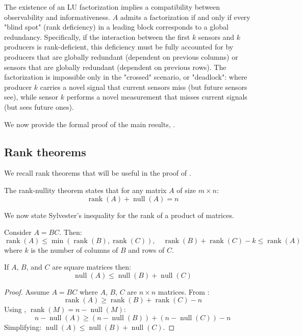 \documentclass[10pt,twoside]{siamart1116}
\DeclareMathOperator{\rk}{rank}
\DeclareMathOperator{\nl}{null}
\numberwithin{theorem}{section}
\begin{document}
The existence of an LU factorization implies a compatibility between observability and informativeness. $A$ admits a factorization if and only if every "blind spot" (rank deficiency) in a leading block corresponds to a global redundancy. Specifically, if the interaction between the first $k$ sensors and $k$ producers is rank-deficient, this deficiency must be fully accounted for by producers that are globally redundant (dependent on previous columns) or sensors that are globally redundant (dependent on previous rows). The factorization is impossible only in the "crossed" scenario, or "deadlock": where producer $k$ carries a novel signal that current sensors miss (but future sensors see), while sensor $k$ performs a novel measurement that misses current signals (but sees future ones).

We now provide the formal proof of the main results, .

\subsection{Rank theorems}

We recall rank theorems that will be useful in the proof of .

\begin{theorem}\label{thm:rank-nullity}
	The rank-nullity theorem states that for any matrix $A$ of size $m \times n$:
	\[
		\rk(A) + \nl(A) = n
	\]
\end{theorem}

We now state Sylvester's inequality for the rank of a product of matrices.

\begin{lemma}\label{lem:rank}
	Consider $A = BC$. Then:
	\[
		\rk(A) \le \min(\rk(B), \rk(C)), \quad
		\rk(B) + \rk(C) - k \le \rk(A)
	\]
	where $k$ is the number of columns of $B$ and rows of $C$.
\end{lemma}

\begin{corollary}\label{cor:nullity}
	If $A$, $B$, and $C$ are square matrices then:
	\[
		\nl(A) \le \nl(B) + \nl(C)
	\]
\end{corollary}

\begin{proof}
	Assume $A = BC$ where $A$, $B$, $C$ are $n \times n$ matrices. From :
	\[ \rk(A) \ge \rk(B) + \rk(C) - n \]
	Using , $\rk(M) = n - \nl(M)$:
	\[ n - \nl(A) \ge (n - \nl(B)) + (n - \nl(C)) - n \]
	Simplifying: $\nl(A) \le \nl(B) + \nl(C)$.
\end{proof}
\end{document}
